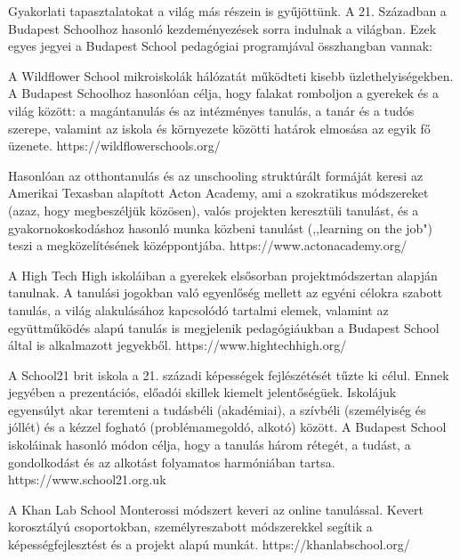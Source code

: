 Gyakorlati tapasztalatokat a világ más részein is gyűjöttünk. A 21.
Században a Budapest Schoolhoz hasonló kezdeményezések sorra indulnak a
világban. Ezek egyes jegyei a Budapest School pedagógiai programjával
összhangban vannak:

A Wildflower School mikroiskolák hálózatát működteti kisebb
üzlethelyiségekben. A Budapest Schoolhoz hasonlóan célja, hogy falakat
romboljon a gyerekek és a világ között: a magántanulás és az intézményes
tanulás, a tanár és a tudós szerepe, valamint az iskola és környezete
közötti határok elmosása az egyik fő üzenete.
https://wildflowerschools.org/

Hasonlóan az otthontanulás és az  unschooling struktúrált formáját keresi az
Amerikai Texasban alapított Acton Academy, ami a szokratikus módszereket (azaz,
hogy megbeszéljük közösen), valós projekten keresztüli tanulást, és a
gyakornokoskodáshoz hasonló munka közbeni tanulást (,,learning on the job")
teszi a megközelítésének középpontjába.
https://www.actonacademy.org/

A High Tech High iskoláiban a gyerekek elsősorban projektmódszertan
alapján tanulnak. A tanulási jogokban való egyenlőség mellett az egyéni
célokra szabott tanulás, a világ alakulásához kapcsolódó tartalmi
elemek, valamint az együttműködés alapú tanulás is megjelenik
pedagógiáukban a Budapest School által is alkalmazott jegyekből.
https://www.hightechhigh.org/

A School21 brit iskola a 21. századi képességek fejlészétését tűzte ki
célul. Ennek jegyében a prezentációs, előadói skillek kiemelt
jelentőségüek. Iskolájuk egyensúlyt akar teremteni a tudásbéli
(akadémiai), a szívbéli (személyiség és jóllét) és a kézzel fogható
(problémamegoldó, alkotó) között. A Budapest School iskoláinak hasonló
módon célja, hogy a tanulás három rétegét, a tudást, a gondolkodást és
az alkotást folyamatos harmóniában tartsa. https://www.school21.org.uk

A Khan Lab School Monterossi módszert keveri az online tanulással. Kevert
korosztályú csoportokban, személyreszabott módszerekkel segítik a
képességfejlesztést és a projekt alapú munkát.
https://khanlabschool.org/
